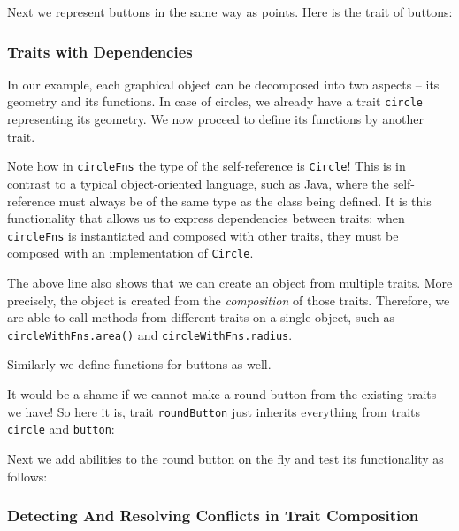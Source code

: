Next we represent buttons in the same way as points. Here is the trait of
buttons:

\subsubsection{Traits with Dependencies}

In our example, each graphical object can be decomposed into two aspects -- its
geometry and its functions. In case of circles, we already have a trait
\lstinline{circle} representing its geometry. We now proceed to define its
functions by another trait.

Note how in \lstinline$circleFns$ the type of the self-reference is
\lstinline$Circle$! This is in contrast to a typical object-oriented language,
such as Java, where the self-reference must always be of the same type as the
class being defined. It is this functionality that allows us to express
dependencies between traits: when \lstinline$circleFns$ is instantiated and
composed with other traits, they must be composed with an implementation of
\lstinline$Circle$.

The above line also shows that we can create an object from multiple traits.
More precisely, the object is created from the \textit{composition} of those
traits. Therefore, we are able to call methods from different traits on a single
object, such as \lstinline{circleWithFns.area()} and
\lstinline{circleWithFns.radius}.

Similarly we define functions for buttons as well.

It would be a shame if we cannot make a round button from the existing traits we
have! So here it is, trait \lstinline{roundButton} just inherits everything from
traits \lstinline{circle} and \lstinline{button}:

Next we add abilities to the round button on the fly and test its functionality
as follows:



\subsubsection{Detecting And Resolving Conflicts in Trait Composition}
\label{sec:conflicts}

